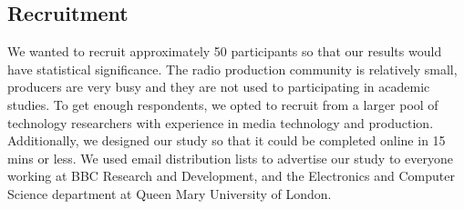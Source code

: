 
\subsection{Recruitment}
We wanted to recruit approximately 50 participants so that our results would have statistical significance.  The radio
production community is relatively small, producers are very busy and they are not used to participating in academic
studies. To get enough respondents, we opted to recruit from a larger pool of technology researchers with experience in
media technology and production.  Additionally, we designed our study so that it could be completed online in 15 mins
or less.  We used email distribution lists to advertise our study to everyone working at BBC Research and Development,
and the Electronics and Computer Science department at Queen Mary University of London.

